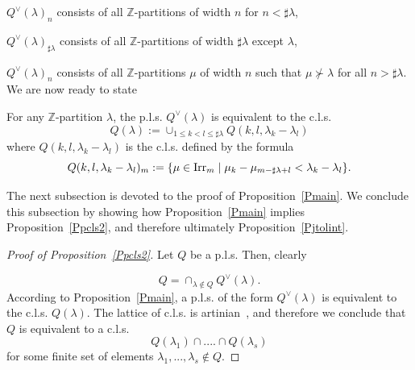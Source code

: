 \documentclass[10pt]{amsart}\oddsidemargin -1mm \evensidemargin -1mm \topmargin -15mm\headheight5mm \headsep 3.5mm \textheight 245mm\textwidth 170mm %
\begin{document}
$Q^\vee(\lambda)_n$ consists of all $\mathbb Z$-partitions of width $n$ for $n<\sharp\lambda$,

$Q^\vee(\lambda)_{\sharp\lambda}$ consists of all $\mathbb Z$-partitions of width $\sharp\lambda$ except $\lambda$,

$Q^\vee(\lambda)_n$ consists of all $\mathbb Z$-partitions $\mu$ of width $n$ such that $\mu\not\succ\lambda$ for all $n>\sharp\lambda$.\\
We are now ready to state
\begin{proposition}\label{Pmain}For any $\mathbb Z$-partition $\lambda$, the p.l.s. $Q^\vee(\lambda)$ is equivalent to the c.l.s.
$$Q(\lambda):=\cup_{1\le k< l\le \sharp\lambda} Q(k, l, \lambda_k-\lambda_l)$$
where $Q(k, l, \lambda_k-\lambda_l)$ is the c.l.s. defined by the formula
$$Q(k, l, \lambda_k-\lambda_l)_m:=\{\mu\in\operatorname{\mathrm{Irr}}_m\mid \mu_k-\mu_{m-\sharp\lambda+l}<\lambda_k-\lambda_l\}.$$
\end{proposition}
The next subsection is devoted to the proof of Proposition~\ref{Pmain}. We conclude this subsection by showing how Proposition~\ref{Pmain} implies Proposition~\ref{Ppcls2}, and therefore ultimately Proposition~\ref{Pjtolint}.
\begin{proof}[Proof of Proposition~\ref{Ppcls2}]
Let $Q$ be a p.l.s. Then, clearly

$$Q=\cap_{\lambda\not\in Q} Q^\vee(\lambda).$$
According to Proposition~\ref{Pmain}, a p.l.s. of the form $Q^\vee(\lambda)$ is equivalent to the c.l.s. $Q(\lambda)$. The lattice of c.l.s. is artinian~\cite{Zh1}, and therefore we conclude that $Q$ is equivalent to
a c.l.s. $$Q(\lambda_1)\cap....\cap Q(\lambda_s)$$
for some finite set of elements $\lambda_1,..., \lambda_s\not\in Q$.\end{proof}
\end{document}
